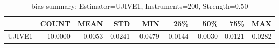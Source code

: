 \begin{table}[ht]
\centering
\caption{bias summary: Estimator=UJIVE1, Instruments=200, Strength=0.50}
\begin{tabular}{lrrrrrrrr}
\toprule
 & COUNT & MEAN & STD & MIN & 25\% & 50\% & 75\% & MAX \\
\midrule
UJIVE1 & 10.0000 & -0.0053 & 0.0241 & -0.0479 & -0.0144 & -0.0030 & 0.0121 & 0.0282 \\
\bottomrule
\end{tabular}
\end{table}
